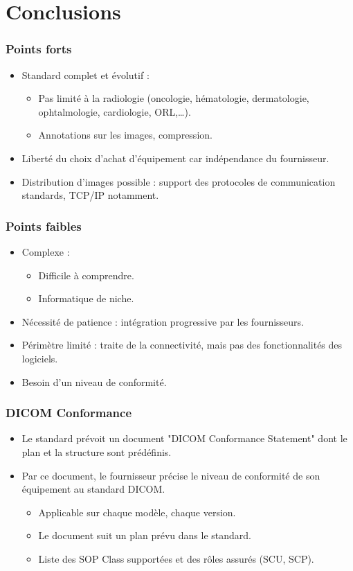 \section{Conclusions}

\frame
{
	\frametitle{Points forts}
	\begin{itemize}
		\item Standard complet et \'evolutif :
		\begin{itemize}
			\item Pas limit\'e \`a la radiologie (oncologie, h\'ematologie, dermatologie, ophtalmologie, cardiologie, ORL,\ldots).
			\item Annotations sur les images, compression.
		\end{itemize}
		\item Libert\'e du choix d'achat d'\'equipement car ind\'ependance du fournisseur.
		\item Distribution d'images possible : support des protocoles de communication standards, TCP/IP notamment.
	\end{itemize}
}

\frame
{
	\frametitle{Points faibles}
	\begin{itemize}
		\item Complexe :
		\begin{itemize}
			\item Difficile \`a comprendre.
			\item Informatique de niche.
		\end{itemize}
		\item N\'ecessit\'e de patience : int\'egration progressive par les fournisseurs.
		\item P\'erim\`etre limit\'e : traite de la connectivit\'e, mais pas des fonctionnalit\'es des logiciels.
		\item Besoin d'un niveau de conformit\'e.
	\end{itemize}
}

\frame
{
	\frametitle{DICOM Conformance}
	\begin{itemize}
		\item Le standard pr\'evoit un document "DICOM Conformance Statement" dont le plan et la structure sont pr\'ed\'efinis.
		\item Par ce document, le fournisseur pr\'ecise le niveau de conformit\'e de son \'equipement au standard DICOM.
		\begin{itemize}
			\item Applicable sur chaque mod\`ele, chaque version.
			\item Le document suit un plan pr\'evu dans le standard.
			\item Liste des SOP Class support\'ees et des r\^oles assur\'es (SCU, SCP).
		\end{itemize}
	\end{itemize}
}

